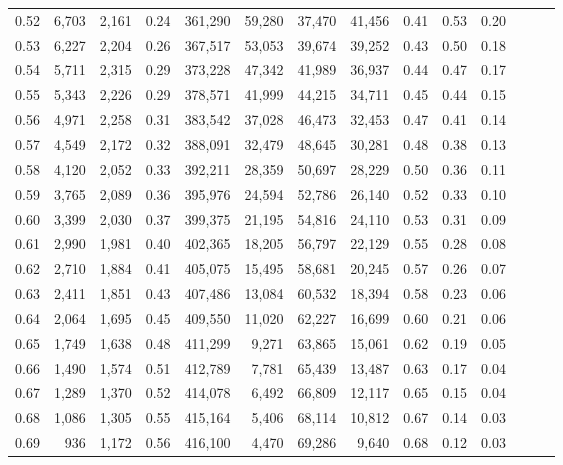 \begin{tabular}{rrrrrrrrrrrrrr}
0.52 &   6,703 &  2,161 &  0.24 &  361,290 &   59,280 &  37,470 &  41,456 &  0.41 &  0.53 &      0.20 \\
0.53 &   6,227 &  2,204 &  0.26 &  367,517 &   53,053 &  39,674 &  39,252 &  0.43 &  0.50 &      0.18 \\
0.54 &   5,711 &  2,315 &  0.29 &  373,228 &   47,342 &  41,989 &  36,937 &  0.44 &  0.47 &      0.17 \\
0.55 &   5,343 &  2,226 &  0.29 &  378,571 &   41,999 &  44,215 &  34,711 &  0.45 &  0.44 &      0.15 \\
0.56 &   4,971 &  2,258 &  0.31 &  383,542 &   37,028 &  46,473 &  32,453 &  0.47 &  0.41 &      0.14 \\
0.57 &   4,549 &  2,172 &  0.32 &  388,091 &   32,479 &  48,645 &  30,281 &  0.48 &  0.38 &      0.13 \\
0.58 &   4,120 &  2,052 &  0.33 &  392,211 &   28,359 &  50,697 &  28,229 &  0.50 &  0.36 &      0.11 \\
0.59 &   3,765 &  2,089 &  0.36 &  395,976 &   24,594 &  52,786 &  26,140 &  0.52 &  0.33 &      0.10 \\
0.60 &   3,399 &  2,030 &  0.37 &  399,375 &   21,195 &  54,816 &  24,110 &  0.53 &  0.31 &      0.09 \\
0.61 &   2,990 &  1,981 &  0.40 &  402,365 &   18,205 &  56,797 &  22,129 &  0.55 &  0.28 &      0.08 \\
0.62 &   2,710 &  1,884 &  0.41 &  405,075 &   15,495 &  58,681 &  20,245 &  0.57 &  0.26 &      0.07 \\
0.63 &   2,411 &  1,851 &  0.43 &  407,486 &   13,084 &  60,532 &  18,394 &  0.58 &  0.23 &      0.06 \\
0.64 &   2,064 &  1,695 &  0.45 &  409,550 &   11,020 &  62,227 &  16,699 &  0.60 &  0.21 &      0.06 \\
0.65 &   1,749 &  1,638 &  0.48 &  411,299 &    9,271 &  63,865 &  15,061 &  0.62 &  0.19 &      0.05 \\
0.66 &   1,490 &  1,574 &  0.51 &  412,789 &    7,781 &  65,439 &  13,487 &  0.63 &  0.17 &      0.04 \\
0.67 &   1,289 &  1,370 &  0.52 &  414,078 &    6,492 &  66,809 &  12,117 &  0.65 &  0.15 &      0.04 \\
0.68 &   1,086 &  1,305 &  0.55 &  415,164 &    5,406 &  68,114 &  10,812 &  0.67 &  0.14 &      0.03 \\
0.69 &     936 &  1,172 &  0.56 &  416,100 &    4,470 &  69,286 &   9,640 &  0.68 &  0.12 &      0.03 \\

\end{tabular}
